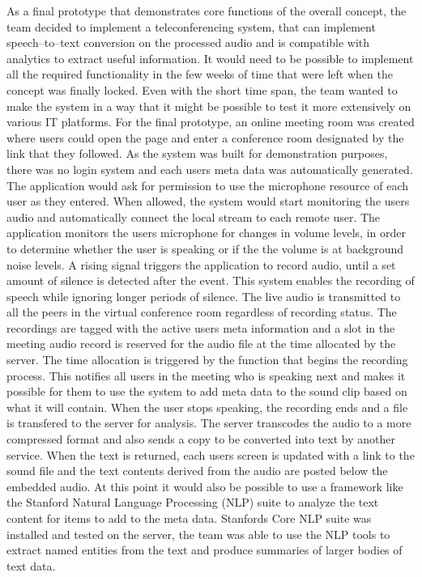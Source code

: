 \documentclass[english,12pt,a4paper,dvips]{article}
\begin{document}
As a final prototype that demonstrates core functions of the overall concept, the team decided to implement a teleconferencing system, that can implement speech--to--text conversion on the processed audio and is compatible with analytics to extract useful information. It would need to be possible to implement all the required functionality in the few weeks of time that were left when the concept was finally locked. Even with the short time span, the team wanted to make the system in a way that it might be possible to test it more extensively on various IT platforms.
For the final prototype, an online meeting room was created where users could open the page and enter a conference room designated by the link that they followed. As the system was built for demonstration purposes, there was no login system and each users meta data was automatically generated. The application would ask for permission to use the microphone resource of each user as they entered. When allowed, the system would start monitoring the users audio and automatically connect the local stream to each remote user.
The application monitors the users microphone for changes in volume levels, in order to determine whether the user is speaking or if the the volume is at background noise levels. A rising signal triggers the application to record audio, until a set amount of silence is detected after the event. This system enables the recording of speech while ignoring longer periods of silence. The live audio is transmitted to all the peers in the virtual conference room regardless of recording status. The recordings are tagged with the active users meta information and a slot in the meeting audio record is reserved for the audio file at the time allocated by the server. The time allocation is triggered by the function that begins the recording process. This notifies all users in the meeting who is speaking next and makes it possible for them to use the system to add meta data to the sound clip based on what it will contain. When the user stops speaking, the recording ends and a file is transfered to the server for analysis. The server transcodes the audio to a more compressed format and also sends a copy to be converted into text by another service. When the text is returned, each users screen is updated with a link to the sound file and the text contents derived from the audio are posted below the embedded audio. At this point it would also be possible to use a framework like the Stanford Natural Language Processing (NLP) suite to analyze the text content for items to add to the meta data. Stanfords Core NLP suite was installed and tested on the server, the team was able to use the NLP tools to extract named entities from the text and produce summaries of larger bodies of text data.
\end{document}
